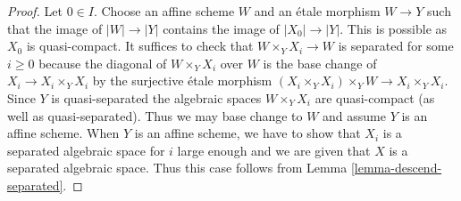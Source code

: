 \documentclass{stacks-project}
\theoremstyle{plain}
\theoremstyle{definition}
\theoremstyle{remark}
\numberwithin{equation}{subsection}
\begin{document}
\begin{proof}
Let $0 \in I$. Choose an affine scheme $W$ and an \'etale morphism
$W \to Y$ such that the image of $|W| \to |Y|$ contains the image of
$|X_0| \to |Y|$. This is possible as $X_0$ is quasi-compact.
It suffices to check that $W \times_Y X_i \to W$ is separated
for some $i \geq 0$ because the diagonal of $W \times_Y X_i$
over $W$ is the base change of $X_i \to X_i \times_Y X_i$ by
the surjective \'etale morphism $(X_i \times_Y X_i) \times_Y W \to
X_i \times_Y X_i$. Since $Y$ is quasi-separated the algebraic spaces
$W \times_Y X_i$ are quasi-compact (as well as quasi-separated).
Thus we may base change to $W$ and assume $Y$ is an affine scheme.
When $Y$ is an affine scheme, we have to show that $X_i$ is a
separated algebraic space for $i$ large enough and we are given that
$X$ is a separated algebraic space. Thus this case follows from
Lemma \ref{lemma-descend-separated}.
\end{proof}
\end{document}
